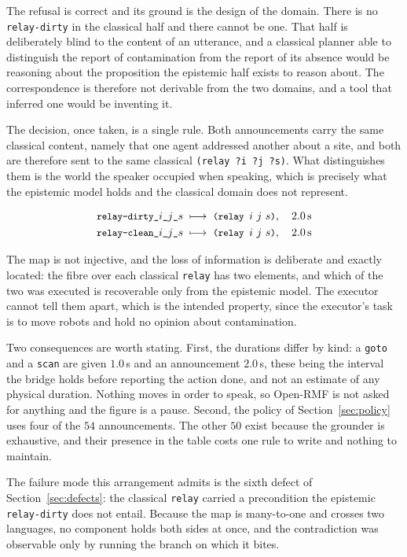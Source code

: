 \documentclass[11pt,a4paper]{article}
\theoremstyle{definition}
\newcommand{\code}[1]{\texttt{\small #1}}
\begin{document}
The refusal is correct and its ground is the design of the domain. There is no
\code{relay-dirty} in the classical half and there cannot be one. That half is
deliberately blind to the content of an utterance, and a classical planner able
to distinguish the report of contamination from the report of its absence would
be reasoning about the proposition the epistemic half exists to reason about.
The correspondence is therefore not derivable from the two domains, and a tool
that inferred one would be inventing it.

The decision, once taken, is a single rule. Both announcements carry the same
classical content, namely that one agent addressed another about a site, and
both are therefore sent to the same classical
\code{(relay ?i ?j ?s)}. What distinguishes them is the world the speaker
occupied when speaking, which is precisely what the epistemic model holds and
the classical domain does not represent.

\begin{align*}
\code{relay-dirty\_}i\code{\_}j\code{\_}s \;&\longmapsto\;
  \code{(relay }i\ j\ s\code{)}, \quad 2.0\,\mathrm{s} \\
\code{relay-clean\_}i\code{\_}j\code{\_}s \;&\longmapsto\;
  \code{(relay }i\ j\ s\code{)}, \quad 2.0\,\mathrm{s}
\end{align*}

The map is not injective, and the loss of information is deliberate and exactly
located: the fibre over each classical \code{relay} has two elements, and which
of the two was executed is recoverable only from the epistemic model. The
executor cannot tell them apart, which is the intended property, since the
executor's task is to move robots and hold no opinion about contamination.

Two consequences are worth stating. First, the durations differ by kind: a
\code{goto} and a \code{scan} are given $1.0$\,s and an announcement $2.0$\,s,
these being the interval the bridge holds before reporting the action done, and
not an estimate of any physical duration. Nothing moves in order to speak, so
Open-RMF is not asked for anything and the figure is a pause. Second, the
policy of Section~\ref{sec:policy} uses four of the $54$ announcements. The
other $50$ exist because the grounder is exhaustive, and their presence in the
table costs one rule to write and nothing to maintain.

The failure mode this arrangement admits is the sixth defect of
Section~\ref{sec:defects}: the classical \code{relay} carried a precondition
the epistemic \code{relay-dirty} does not entail. Because the map is many-to-one
and crosses two languages, no component holds both sides at once, and the
contradiction was observable only by running the branch on which it bites.
\end{document}
